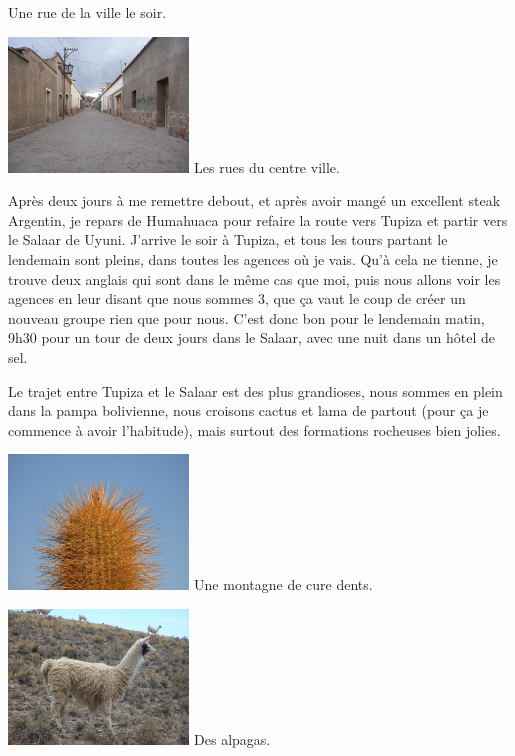 \begin{multicols}{2}
Une rue de la ville le soir.

\hspace*{-0.65cm}
\includegraphics[width=4.8cm]{articles/La-paz-humahuaca-et-salaar/1257387531xqvF.jpg}
Les rues du centre ville.

Après deux jours à me remettre debout, et après avoir mangé un excellent steak Argentin, je repars de Humahuaca pour refaire la route vers Tupiza et partir vers le Salaar de Uyuni. J'arrive le soir à Tupiza, et tous les tours partant le lendemain sont pleins, dans toutes les agences où je vais. Qu'à cela ne tienne, je trouve deux anglais qui sont dans le même cas que moi, puis nous allons voir les agences en leur disant que nous sommes 3, que ça vaut le coup de créer un nouveau groupe rien que pour nous. C'est donc bon pour le lendemain matin, 9h30 pour un tour de deux jours dans le Salaar, avec une nuit dans un hôtel de sel.

Le trajet entre Tupiza et le Salaar est des plus grandioses, nous sommes en plein dans la pampa bolivienne, nous croisons cactus et lama de partout (pour ça je commence à avoir l'habitude), mais surtout des formations rocheuses bien jolies.

\hspace*{-0.65cm}
\includegraphics[width=4.8cm]{articles/La-paz-humahuaca-et-salaar/12572037289e7N.jpg}
Une montagne de cure dents.

\hspace*{-0.65cm}
\includegraphics[width=4.8cm]{articles/La-paz-humahuaca-et-salaar/1257387254hVhj.jpg}
Des alpagas.


\end{multicols}
